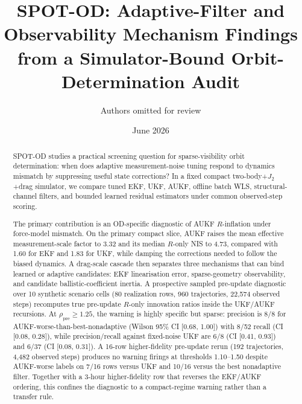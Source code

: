 \documentclass{article}
\title{SPOT-OD: Adaptive-Filter and Observability Mechanism Findings from a Simulator-Bound Orbit-Determination Audit}
\author{Authors omitted for review}
\date{June 2026}
\begin{document}
\maketitle

\begin{abstract}
\noindent SPOT-OD studies a practical screening question for sparse-visibility orbit determination: when does adaptive measurement-noise tuning respond to dynamics mismatch by suppressing useful state corrections? In a fixed compact two-body+$J_2$+drag simulator, we compare tuned EKF, UKF, AUKF, offline batch WLS, structural-channel filters, and bounded learned residual estimators under common observed-step scoring.

The primary contribution is an OD-specific diagnostic of AUKF \(R\)-inflation under force-model mismatch. On the primary compact slice, AUKF raises the mean effective measurement-scale factor to 3.32 and its median \(R\)-only NIS to 4.73, compared with 1.60 for EKF and 1.83 for UKF, while damping the corrections needed to follow the biased dynamics. A drag-scale cascade then separates three mechanisms that can bind learned or adaptive candidates: EKF linearisation error, sparse-geometry observability, and candidate ballistic-coefficient inertia. A prospective sampled pre-update diagnostic over 10 synthetic scenario cells (80 realization rows, 960 trajectories, 22,574 observed steps) recomputes true pre-update \(R\)-only innovation ratios inside the UKF/AUKF recursions. At \(\rho_{\mathrm{pre}}\geq1.25\), the warning is highly specific but sparse: precision is 8/8 for AUKF-worse-than-best-nonadaptive (Wilson 95\% CI [0.68, 1.00]) with 8/52 recall (CI [0.08, 0.28]), while precision/recall against fixed-noise UKF are 6/8 (CI [0.41, 0.93]) and 6/37 (CI [0.08, 0.31]). A 16-row higher-fidelity pre-update rerun (192 trajectories, 4,482 observed steps) produces no warning firings at thresholds 1.10--1.50 despite AUKF-worse labels on 7/16 rows versus UKF and 10/16 versus the best nonadaptive filter. Together with a 3-hour higher-fidelity row that reverses the EKF/AUKF ordering, this confines the diagnostic to a compact-regime warning rather than a transfer rule.


\end{abstract}
\end{document}
